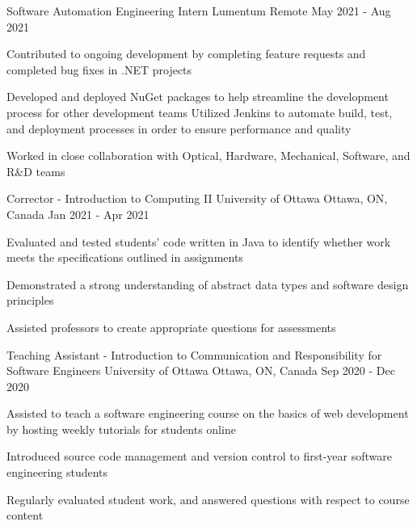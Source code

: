 \begin{cventries}
  \cventry
    {Software Automation Engineering Intern} %
    {Lumentum} %
    {Remote} %
    {May 2021 - Aug 2021} %
    {
      \begin{cvitems} %
\item Contributed to ongoing development by completing feature requests and completed bug fixes in .NET projects
\item Developed and deployed NuGet packages to help streamline the development process for other development teams
\items Utilized Jenkins to automate build, test, and deployment processes in order to ensure performance and quality
\item Worked in close collaboration with Optical, Hardware, Mechanical, Software, and R\&D teams
      \end{cvitems}
    }
  \cventry
    {Corrector - Introduction to Computing II} %
    {University of Ottawa} %
    {Ottawa, ON, Canada} %
    {Jan 2021 - Apr 2021} %
    {
      \begin{cvitems} %
\item Evaluated and tested students' code written in Java to identify whether work meets the specifications outlined in assignments
\item Demonstrated a strong understanding of abstract data types and software design principles
\item Assisted professors to create appropriate questions for assessments
      \end{cvitems}
    }
  \cventry
    {Teaching Assistant - Introduction to Communication and Responsibility for Software Engineers} %
    {University of Ottawa} %
    {Ottawa, ON, Canada} %
    {Sep 2020 - Dec 2020} %
    {
      \begin{cvitems} %
\item Assisted to teach a software engineering course on the basics of web development by hosting weekly tutorials for students online
\item Introduced source code management and version control to first-year software engineering students
\item Regularly evaluated student work, and answered questions with respect to course content

\end{cvitems}}
\end{cventries}
